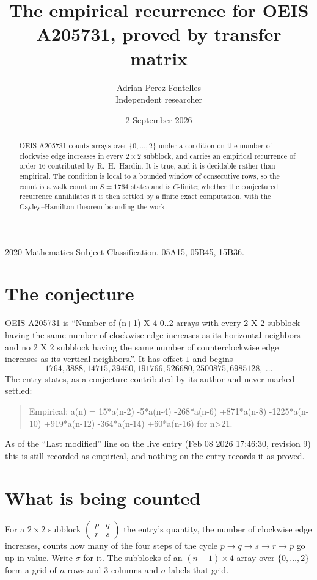 \documentclass[11pt,a4paper]{article}
\title{The empirical recurrence for OEIS A205731, proved by transfer matrix}
\author{Adrian Perez Fontelles\\ \small Independent researcher}
\date{2 September 2026}
\theoremstyle{plain}
\theoremstyle{definition}
\begin{document}
\maketitle

\begin{abstract}
OEIS A205731 counts arrays over $\{0,\dots,2\}$ under a condition on the number of clockwise edge increases
in every $2\times2$ subblock, and carries an empirical recurrence of order $16$ contributed by
R.~H.~Hardin. It is true, and it is decidable rather than empirical. The condition is local to
a bounded window of consecutive rows, so the count is a walk count on $S=1764$ states and is
$C$-finite; whether the conjectured recurrence annihilates it is then settled by a finite exact
computation, with the Cayley--Hamilton theorem bounding the work.
\end{abstract}

\noindent\small 2020 Mathematics Subject Classification. 05A15, 05B45, 15B36.\normalsize

\section{The conjecture}

OEIS A205731 is ``Number of (n+1) X 4 0..2 arrays with every 2 X 2 subblock having the same number of clockwise edge increases as its horizontal neighbors and no 2 X 2 subblock having the same number of counterclockwise edge increases as its vertical neighbors.''. It has offset $1$ and begins
\[
1764, 3888, 14715, 39450, 191766, 526680, 2500875, 6985128,\ \dots
\]
The entry states, as a conjecture contributed by its author and never marked settled:
\begin{quote}
Empirical: a(n) = 15*a(n-2) -5*a(n-4) -268*a(n-6) +871*a(n-8) -1225*a(n-10) +919*a(n-12) -364*a(n-14) +60*a(n-16) for n>21.
\end{quote}
As of the ``Last modified'' line on the live entry (Feb 08 2026 17:46:30, revision 9) this is still
recorded as empirical, and nothing on the entry records it as proved.

\section{What is being counted}

For a $2\times2$ subblock $\begin{pmatrix}p&q\\r&s\end{pmatrix}$ the
entry's quantity, the number of clockwise edge increases, counts how many of the four steps of the cycle $p\to q\to s\to r\to p$ go up in value. Write $\sigma$ for it. The subblocks of an
$(n+1)\times4$ array over $\{0,\dots,2\}$ form a grid of $n$ rows and $3$
columns and $\sigma$ labels that grid.
\end{document}
